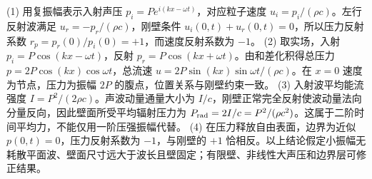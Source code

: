 (1) 用复振幅表示入射声压 \(p_i=P e^{i(kx-\omega t)}\)，对应粒子速度 \(u_i=p_i/(\rho c)\)。左行反射波满足 \(u_r=-p_r/(\rho c)\)，刚壁条件 \(u_i(0,t)+u_r(0,t)=0\)，所以压力反射系数 \(r_p=p_r(0)/p_i(0)=+1\)，而速度反射系数为 \(-1\)。
(2) 取实场，入射 \(p_i=P\cos(kx-\omega t)\)，反射 \(p_r=P\cos(kx+\omega t)\)。由和差化积得总压力 \(p=2P\cos(kx)\cos\omega t\)，总流速 \(u=2P\sin(kx)\sin\omega t/(\rho c)\)。在 \(x=0\) 速度为节点，压力为振幅 \(2P\) 的腹点，位置关系与刚壁约束一致。
(3) 入射波平均能流强度 \(I=P^2/(2\rho c)\)。声波动量通量大小为 \(I/c\)，刚壁正常完全反射使波动量法向分量反向，因此壁面所受平均辐射压力为 \(P_{\rm rad}=2I/c=P^2/(\rho c^2)\)。这属于二阶时间平均力，不能仅用一阶压强振幅代替。
(4) 在压力释放自由表面，边界为近似 \(p(0,t)=0\)，压力反射系数为 \(-1\)，与刚壁的 \(+1\) 恰相反。以上结论假定小振幅无耗散平面波、壁面尺寸远大于波长且壁固定；有限壁、非线性大声压和边界层可修正结果。
